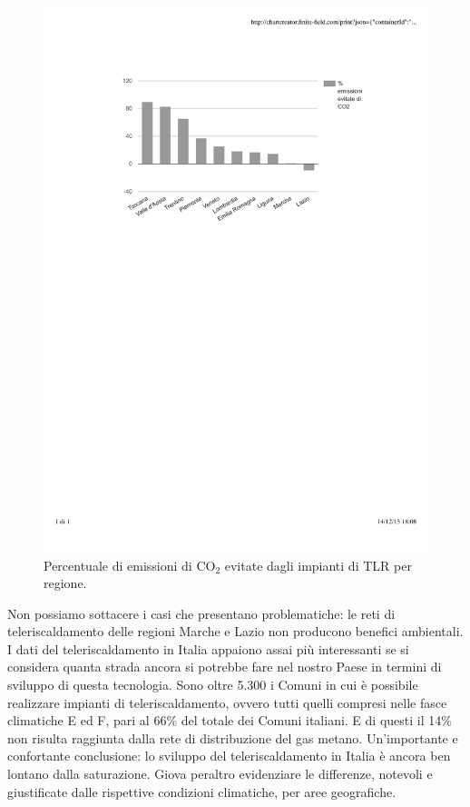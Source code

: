 \documentclass[laurea,oneside,11pt]{USiena_tesiLM3}
\begin{document}
\begin{figure}[!ht]
\centering
\includegraphics[width=\textwidth]{figure/CO2} 
\caption{Percentuale di emissioni di CO$_2$ evitate dagli impianti di TLR per regione.}
\label{fig:CO2}
\end{figure}

Non possiamo sottacere i casi che presentano problematiche: le reti di teleriscaldamento delle regioni Marche e Lazio non producono benefici ambientali.\\

I dati del teleriscaldamento in Italia appaiono assai più interessanti se si considera quanta strada ancora si potrebbe fare nel nostro Paese in termini di sviluppo di questa tecnologia. Sono oltre 5.300 i Comuni in cui è possibile realizzare impianti di teleriscaldamento, ovvero tutti quelli compresi nelle fasce climatiche E ed F, pari al 66\% del totale dei Comuni italiani. E di questi il 14\% non risulta raggiunta dalla rete di distribuzione del gas metano. 
Un'importante e confortante conclusione: lo sviluppo del teleriscaldamento in Italia è ancora ben lontano dalla saturazione.
Giova peraltro evidenziare le differenze, notevoli e giustificate dalle rispettive condizioni climatiche, per aree geografiche.\\
\end{document}

